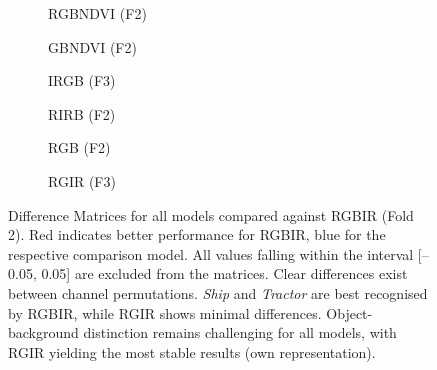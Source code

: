 \begin{figure}[htbp]
    \centering
    \begin{subfigure}{0.48\textwidth}
        \centering
        
        \caption{RGBNDVI (F2)}
        \label{fig:perm_exp_diffM_rgbndvi_f2}
    \end{subfigure}
    \begin{subfigure}{0.48\textwidth}
        \centering
        
        \caption{GBNDVI (F2)}
        \label{fig:perm_exp_diffM_gbndvi_f2}
    \end{subfigure}
    
    \begin{subfigure}{0.48\textwidth}
        \centering
        
        \caption{IRGB (F3)}
        \label{fig:perm_exp_diffM_irgb_f3}
    \end{subfigure}
    \begin{subfigure}{0.48\textwidth}
        \centering
        
        \caption{RIRB (F2)}
        \label{fig:perm_exp_diffM_RIRB_f2}
    \end{subfigure}
    
    \begin{subfigure}{0.48\textwidth}
        \centering
        
        \caption{RGB (F2)}
        \label{fig:perm_exp_diffM_RGB_f2}
    \end{subfigure}
    \begin{subfigure}{0.48\textwidth}
        \centering
        
        \caption{RGIR (F3)}
        \label{fig:perm_exp_diffM_RGIR_f3}
    \end{subfigure}

    \caption[Difference Matrices compared to RGBIR (Fold 2)]{Difference Matrices for all models compared against RGBIR (Fold 2). Red indicates better performance for RGBIR, blue for the respective comparison model. All values falling within the interval [–0.05, 0.05] are excluded from the matrices. Clear differences exist between channel permutations. \textit{Ship} and \textit{Tractor} are best recognised by RGBIR, while RGIR shows minimal differences. Object-background distinction remains challenging for all models, with RGIR yielding the most stable results (own representation).}
    \label{fig:perm_exp_diffM_all}
\end{figure}



